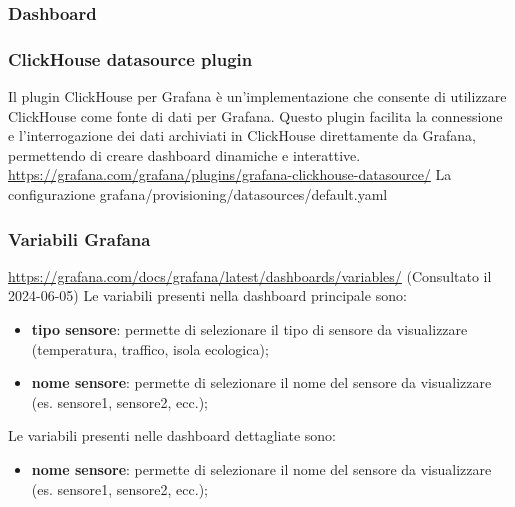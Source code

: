 \subsubsection{Dashboard}

\subsubsection{ClickHouse datasource plugin}
Il plugin ClickHouse per Grafana è un'implementazione che consente di utilizzare ClickHouse come fonte di dati per Grafana. Questo plugin facilita la connessione e l'interrogazione dei dati archiviati in ClickHouse direttamente da Grafana, permettendo di creare dashboard dinamiche e interattive.
\url{https://grafana.com/grafana/plugins/grafana-clickhouse-datasource/}
La configurazione  grafana/provisioning/datasources/default.yaml


\subsubsection{Variabili Grafana}
\url{https://grafana.com/docs/grafana/latest/dashboards/variables/} (Consultato il 2024-06-05)
Le variabili presenti nella dashboard principale sono:
\begin{itemize}
    \item \textbf{tipo sensore}: permette di selezionare il tipo di sensore da visualizzare (temperatura, traffico, isola ecologica);
    \item \textbf{nome sensore}: permette di selezionare il nome del sensore da visualizzare (es. sensore1, sensore2, ecc.);
\end{itemize}
Le variabili presenti nelle dashboard dettagliate sono:
\begin{itemize}
    \item \textbf{nome sensore}: permette di selezionare il nome del sensore da visualizzare (es. sensore1, sensore2, ecc.);
\end{itemize}

